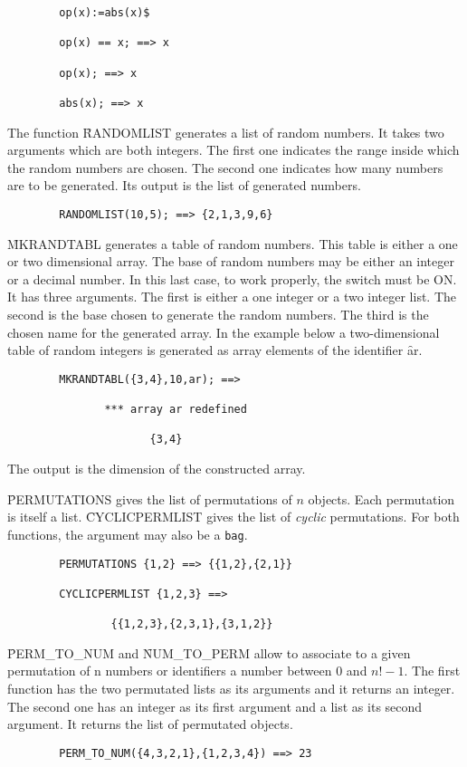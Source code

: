 \begin{itemize}
\begin{verbatim}
        op(x):=abs(x)$

        op(x) == x; ==> x

        op(x); ==> x
        
        abs(x); ==> x
\end{verbatim}
The function \f{RANDOMLIST} generates a list of random numbers. It takes
two arguments which are both integers. The first one indicates the range
inside which the random numbers are chosen. The second one indicates how
many numbers are to be generated. Its output is the list of 
generated numbers.
\begin{verbatim}
        RANDOMLIST(10,5); ==> {2,1,3,9,6}
\end{verbatim}
\f{MKRANDTABL} generates a table of random numbers. This table is either
a one or two dimensional array. The base of random numbers may be either
an integer or a decimal number. In this last case, to work properly,
the switch  must be ON. It has three arguments. The first is
either a one integer or a two integer list. The second is the base chosen
to generate the random numbers. The third is the chosen name for the
generated array. In the example below a two-dimensional table of
random integers is generated as array elements of the identifier {\f ar}.
\begin{verbatim}
        MKRANDTABL({3,4},10,ar); ==>

               *** array ar redefined

                      {3,4}
\end{verbatim}
The output is the dimension of the constructed array.

\f{PERMUTATIONS} gives the list of permutations of $n$ objects.
Each permutation is itself a list. \f{CYCLICPERMLIST} gives the list of
{\em cyclic} permutations. For both functions, the argument may
also be a {\tt bag}.
\begin{verbatim}
        PERMUTATIONS {1,2} ==> {{1,2},{2,1}}

        CYCLICPERMLIST {1,2,3} ==>

                {{1,2,3},{2,3,1},{3,1,2}}
\end{verbatim}
\f{PERM\_TO\_NUM} and \f{NUM\_TO\_PERM} allow to associate to a given 
permutation of n numbers or identifiers a number between $0$ and 
$n! - 1$. The first function has the two permutated lists  
as its arguments and it returns an integer. The second one has an integer  
as its first argument and a list as its second argument. It returns the 
list of permutated objects.
\begin{verbatim}
        PERM_TO_NUM({4,3,2,1},{1,2,3,4}) ==> 23


\end{verbatim}
\end{itemize}
